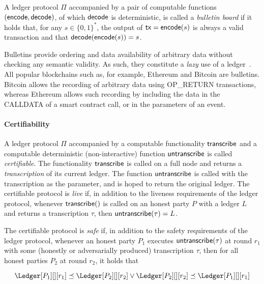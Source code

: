 \begin{definition}
  A ledger protocol $\Pi$ accompanied by a pair of computable
  functions $(\textsf{encode}, \textsf{decode})$, of which $\textsf{decode}$ is deterministic,
  is called a \emph{bulletin board} if it holds that, for any $s \in \{0, 1\}^*$,
  the output of $\textsf{tx} = \textsf{encode}(s)$ is always a valid
  transaction and that $\textsf{decode}(\textsf{encode}(s)) = s$.
\end{definition}

Bulletins provide ordering and data availability of arbitrary data without checking
any semantic validity. As such, they constitute a \emph{lazy} use of a ledger~\cite{lazyledger,lazylight}.
All popular blockchains such as, for example, Ethereum and Bitcoin are bulletins.
Bitcoin allows the recording of arbitrary data using \textsf{OP\_RETURN}
transactions, whereas Ethereum allows such recording by including the
data in the \textsf{CALLDATA} of a smart contract call, or in the parameters
of an event.

\paragraph{Certifiability}

\begin{definition}[Certifiability]
  A ledger protocol $\Pi$ accompanied by a computable functionality $\textsf{transcribe}$
  and a computable deterministic (non-interactive) function $\textsf{untranscribe}$ is called
  \emph{certifiable}. The functionality $\textsf{transcribe}$ is called on a full node
  and returns a \emph{transcription} of its current ledger. The function
  $\textsf{untranscribe}$ is called with the transcription as the parameter,
  and is hoped to return the original ledger.
  The certifiable protocol is \emph{live}
  if, in addition to the liveness requirements of the ledger protocol,
  whenever $\textsf{transcribe}()$ is called on an honest
  party $P$ with a ledger $L$ and returns a transcription $\tau$,
  then $\textsf{untranscribe}(\tau) = L$.

  The certifiable protocol is \emph{safe}
  if,
  in addition to the safety requirements of the ledger protocol,
  whenever an honest party $P_1$ executes $\textsf{untranscribe}(\tau)$ at round $r_1$
  with some (honestly or adversarially produced) transcription $\tau$,
  then for all honest parties $P_2$ at round $r_2$, it holds that

  \[
    \Ledger[P_1][][r_1] \preceq \Ledger[P_2][][r_2] \lor
    \Ledger[P_2][][r_2] \preceq \Ledger[P_1][][r_1]
  \]
\end{definition}

%



